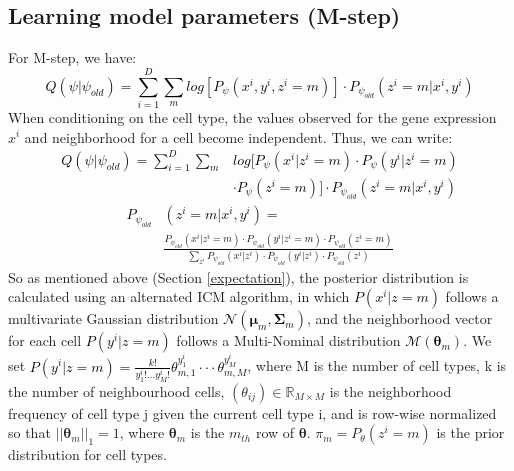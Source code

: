 \subsection{Learning model parameters (M-step)}
For M-step, we have:
\textcolor{black}{
\begin{equation}
Q(\psi|\psi_{old}) = \sum_{i=1}^{D}{\sum_{m}{log[P_{\psi}(x^i,y^i,z^i=m)]\cdot P_{\psi_{old}}(z^i=m|x^i,y^i)}}
\end{equation}
}
When conditioning on the cell type, the values observed for the gene expression $x^i$ and neighborhood for a cell become independent.  Thus, we can write:
\textcolor{black}{
\begin{equation}
\begin{split}
Q(\psi|\psi_{old}) = \sum_{i=1}^{D}\sum_{m}&log[P_{\psi}(x^i|z^i=m)\cdot P_{\psi}(y^i|z^i=m)\\
&\cdot P_{\psi}(z^i=m)]\cdot P_{\psi_{old}}(z^i=m|x^i,y^i)
\end{split}
\end{equation}
\begin{equation}
\begin{split}
P_{\psi_{old}}&(z^i=m|x^i,y^i)=\\
&\frac{P_{\psi_{old}}(x^i|z^i=m)\cdot P_{\psi_{old}}(y^i|z^i=m)\cdot P_{\psi_{old}}(z^i=m)}{\sum_{z^i}{P_{\psi_{old}}(x^i|z^i)\cdot P_{\psi_{old}}(y^i|z^i)}\cdot P_{\psi_{old}}(z^i)}
\end{split}
\end{equation}
}
So as mentioned above (Section \ref{expectation}), the posterior distribution is calculated using an alternated ICM algorithm, in which \textcolor{black}{$P(x^i|z=m)$} follows a multivariate Gaussian distribution \textcolor{black}{$\mathcal{N}(\boldsymbol{\mu}_m,\boldsymbol{\Sigma}_m)$}, and the neighborhood vector for each cell \textcolor{black}{$P(y^i|z=m)$} follows a Multi-Nominal distribution \textcolor{black}{$\mathcal{M}(\boldsymbol{\theta}_m)$}. We set \textcolor{black}{$P(y^i|z=m) = \frac{k!}{y_1^i!... 
y_M^i!}\theta_{m,1}^{y_1^i}\cdot\cdot\cdot\theta_{m,M}^{y_M^i}$}, where M is the number of cell types, k is the number of neighbourhood cells, $(\theta_{ij})\in \mathbb{R}_{M\times M}$ is the neighborhood frequency of cell type j given the current cell type i, and is row-wise normalized so that $||\boldsymbol{\theta}_m||_1 = 1$, where $\boldsymbol{\theta}_m$ is the $m_{th}$ row of $\boldsymbol{\theta}$. $\pi_m = P_{\theta}(z^i=m)$ is the prior distribution for cell types.

